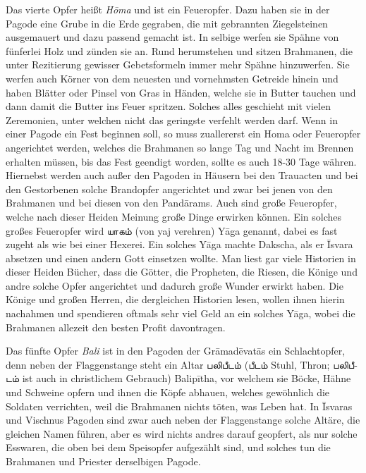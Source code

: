\documentclass{article}
\newcommand{\TamilText}[1]{\texttamil{#1}}
\newcommand{\tam}[1]{\TamilText{#1}}
\begin{document}
Das vierte Opfer heißt \emph{H\={o}ma} und ist ein Feueropfer. Dazu haben sie in der Pagode eine Grube in die Erde gegraben, die mit gebrannten Ziegelsteinen ausgemauert und dazu passend gemacht ist. In selbige werfen sie Spähne von fünferlei Holz und zünden sie an. Rund herumstehen und sitzen Brahmanen, die unter Rezitierung gewisser Gebetsformeln immer mehr Spähne hinzuwerfen. Sie werfen auch Körner von dem neuesten und vornehmsten Getreide hinein und haben Blätter oder Pinsel von Gras in Händen, welche sie in Butter tauchen und dann damit die Butter ins Feuer spritzen. Solches alles geschieht mit vielen Zeremonien, unter welchen nicht das geringste verfehlt werden darf. Wenn in einer Pagode ein Fest beginnen soll, so muss zuallererst ein Homa oder Feueropfer angerichtet werden, welches die Brahmanen so lange Tag und Nacht im Brennen erhalten müssen, bis das Fest geendigt worden, sollte es auch 18-30 Tage währen. Hiernebst werden auch außer den Pagoden in Häusern bei den Trauacten und bei den Gestorbenen solche Brandopfer angerichtet und zwar bei jenen von den Brahmanen und bei diesen von den Pand\={a}rams. Auch sind große Feueropfer, welche nach dieser Heiden Meinung große Dinge erwirken können. Ein solches großes Feueropfer wird \tam{யாகம்} (von yaj verehren) Y\={a}ga genannt, dabei es fast zugeht als wie bei einer Hexerei. Ein solches Y\={a}ga machte Dakscha, als er \={I}svara absetzen und einen andern Gott einsetzen wollte. Man liest gar viele Historien in dieser Heiden Bücher, dass die Götter, die Propheten, die Riesen, die Könige und andre solche Opfer angerichtet und dadurch große Wunder erwirkt haben. Die Könige und großen Herren, die dergleichen Historien lesen, wollen ihnen hierin nachahmen und spendieren oftmals sehr viel Geld an ein solches Y\={a}ga, wobei die Brahmanen allezeit den besten Profit davontragen.

Das fünfte Opfer \emph{Bali} ist in den Pagoden der Gr\={a}mad\={e}vat\={a}s ein Schlachtopfer, denn neben der Flaggenstange steht ein Altar \tam{பலிபீடம்} (\tam{பீடம்} Stuhl, Thron; \tam{பலிபீடம்} ist auch in christlichem Gebrauch) Balip\={i}tha, vor welchem sie Böcke, Hähne und Schweine opfern und ihnen die Köpfe abhauen, welches gewöhnlich die Soldaten verrichten, weil die Brahmanen nichts töten, was Leben hat. In \={I}svaras und Vischnus Pagoden sind zwar auch neben der Flaggenstange solche Altäre, die gleichen Namen führen, aber es wird nichts andres darauf geopfert, als nur solche Esswaren, die oben bei dem Speisopfer aufgezählt sind, und solches tun die Brahmanen und Priester derselbigen Pagode.
\end{document}
